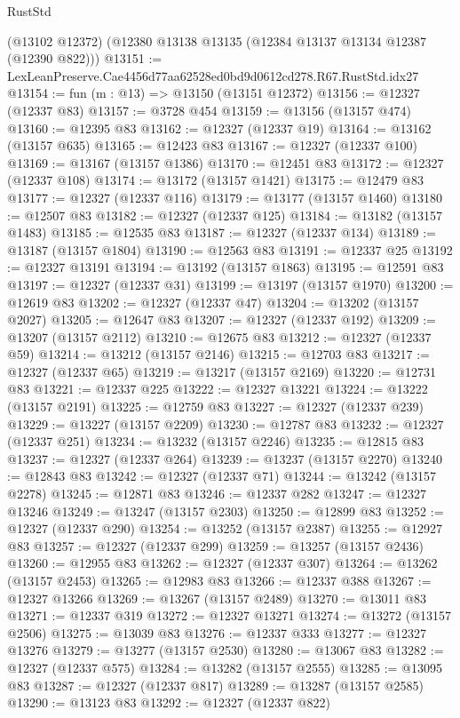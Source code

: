 \begin{lexlean}{RustStd}
\begin{coremodule}
    (@13102 @12372)
    (@12380 @13138 @13135 (@12384 @13137 @13134 @12387 (@12390 @822)))
@13151 := LexLeanPreserve.Cae4456d77aa62528ed0bd9d0612cd278.R67.RustStd.idx27
@13154 := fun (m : @13) => @13150 (@13151 @12372)
@13156 := @12327 (@12337 @83)
@13157 := @3728 @454
@13159 := @13156 (@13157 @474)
@13160 := @12395 @83
@13162 := @12327 (@12337 @19)
@13164 := @13162 (@13157 @635)
@13165 := @12423 @83
@13167 := @12327 (@12337 @100)
@13169 := @13167 (@13157 @1386)
@13170 := @12451 @83
@13172 := @12327 (@12337 @108)
@13174 := @13172 (@13157 @1421)
@13175 := @12479 @83
@13177 := @12327 (@12337 @116)
@13179 := @13177 (@13157 @1460)
@13180 := @12507 @83
@13182 := @12327 (@12337 @125)
@13184 := @13182 (@13157 @1483)
@13185 := @12535 @83
@13187 := @12327 (@12337 @134)
@13189 := @13187 (@13157 @1804)
@13190 := @12563 @83
@13191 := @12337 @25
@13192 := @12327 @13191
@13194 := @13192 (@13157 @1863)
@13195 := @12591 @83
@13197 := @12327 (@12337 @31)
@13199 := @13197 (@13157 @1970)
@13200 := @12619 @83
@13202 := @12327 (@12337 @47)
@13204 := @13202 (@13157 @2027)
@13205 := @12647 @83
@13207 := @12327 (@12337 @192)
@13209 := @13207 (@13157 @2112)
@13210 := @12675 @83
@13212 := @12327 (@12337 @59)
@13214 := @13212 (@13157 @2146)
@13215 := @12703 @83
@13217 := @12327 (@12337 @65)
@13219 := @13217 (@13157 @2169)
@13220 := @12731 @83
@13221 := @12337 @225
@13222 := @12327 @13221
@13224 := @13222 (@13157 @2191)
@13225 := @12759 @83
@13227 := @12327 (@12337 @239)
@13229 := @13227 (@13157 @2209)
@13230 := @12787 @83
@13232 := @12327 (@12337 @251)
@13234 := @13232 (@13157 @2246)
@13235 := @12815 @83
@13237 := @12327 (@12337 @264)
@13239 := @13237 (@13157 @2270)
@13240 := @12843 @83
@13242 := @12327 (@12337 @71)
@13244 := @13242 (@13157 @2278)
@13245 := @12871 @83
@13246 := @12337 @282
@13247 := @12327 @13246
@13249 := @13247 (@13157 @2303)
@13250 := @12899 @83
@13252 := @12327 (@12337 @290)
@13254 := @13252 (@13157 @2387)
@13255 := @12927 @83
@13257 := @12327 (@12337 @299)
@13259 := @13257 (@13157 @2436)
@13260 := @12955 @83
@13262 := @12327 (@12337 @307)
@13264 := @13262 (@13157 @2453)
@13265 := @12983 @83
@13266 := @12337 @388
@13267 := @12327 @13266
@13269 := @13267 (@13157 @2489)
@13270 := @13011 @83
@13271 := @12337 @319
@13272 := @12327 @13271
@13274 := @13272 (@13157 @2506)
@13275 := @13039 @83
@13276 := @12337 @333
@13277 := @12327 @13276
@13279 := @13277 (@13157 @2530)
@13280 := @13067 @83
@13282 := @12327 (@12337 @575)
@13284 := @13282 (@13157 @2555)
@13285 := @13095 @83
@13287 := @12327 (@12337 @817)
@13289 := @13287 (@13157 @2585)
@13290 := @13123 @83
@13292 := @12327 (@12337 @822)

\end{coremodule}
\end{lexlean}

